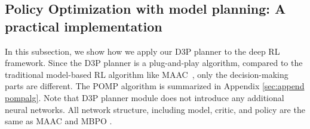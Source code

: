 \documentclass{article} %
\newcommand{\yue}[1]{ {#1}}
\begin{document}
\fi 






\subsection{Policy Optimization with model planning: A practical implementation }

In this subsection, we show how we apply our D3P planner to the deep RL framework. 
Since the D3P planner is a plug-and-play algorithm, compared to the traditional model-based RL algorithm like MAAC~\citep{clavera_model-augmented_2019}, only the  decision-making parts are different. 
The  POMP algorithm  is summarized in Appendix \ref{sec:append pompalg}.  Note that D3P planner module does not introduce any additional neural networks. 
\yue{All network structure, including model, critic, and policy are the same as MAAC \citep{clavera_model-augmented_2019} and MBPO \citep{janner_when_2019}.}
\end{document}
